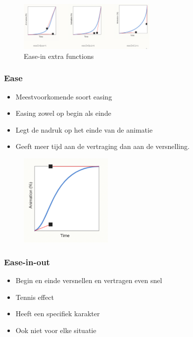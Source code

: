 \documentclass{article}
\begin{document}
\begin{figure}[H]
    \centering
    \includegraphics[width=0.6\textwidth]{animation-ease-in-extra.png}
    \caption{Ease-in extra functions}
\end{figure}

\subsubsection{Ease}

\begin{itemize}
    \item Meestvoorkomende soort easing
    \item Easing zowel op begin als einde
    \item Legt de nadruk op het einde van de animatie
    \item Geeft meer tijd aan de vertraging dan aan de versnelling.
\end{itemize}

\begin{figure}[H]
    \centering
    \includegraphics[width=0.4\textwidth]{animation-ease.png}
    \caption{}
\end{figure}


\subsubsection{Ease-in-out}

\begin{itemize}
    \item Begin en einde versnellen en vertragen even snel
    \item Tennis effect
    \item Heeft een specifiek karakter
    \item Ook niet voor elke situatie
\end{itemize}
\end{document}
